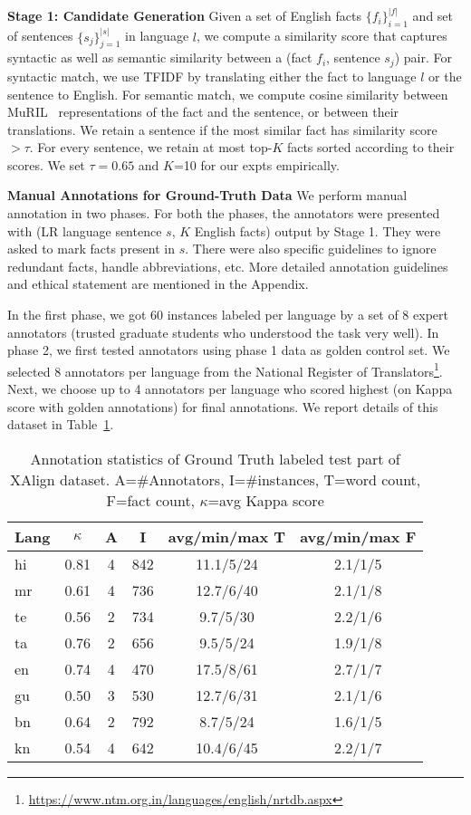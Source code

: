 \documentclass[11pt]{article}
\begin{document}
\noindent\textbf{Stage 1: Candidate Generation}
Given a set of English facts $\{f_i\}_{i=1}^{|f|}$ and set of sentences $\{s_j\}_{j=1}^{|s|}$ in language $l$, we compute a similarity score that captures syntactic as well as semantic similarity between a (fact $f_i$, sentence $s_j$) pair.
For syntactic match, we use TFIDF by translating either the fact to language $l$ or the sentence to English. For semantic match, we compute cosine similarity between MuRIL~\cite{khanuja2021muril} representations of the fact and the sentence, or between their translations. We retain a sentence if the most similar fact has similarity score $>\tau$. For every sentence, we retain at most top-$K$ facts sorted according to their scores. We set $\tau=0.65$ and $K$=10 for our expts empirically.

\noindent\textbf{Manual Annotations for Ground-Truth Data}
We perform manual annotation in two phases. For both the phases, the annotators were presented with (LR language sentence $s$, $K$ English facts) output by Stage 1. They were asked to mark facts present in $s$. There were also specific guidelines to ignore redundant facts, handle abbreviations, etc. More detailed annotation guidelines and ethical statement are mentioned in the Appendix.


In the first phase, we got 60 instances labeled per language by a set of 8 expert annotators (trusted graduate students who understood the task very well). In phase 2, we first tested annotators using phase 1 data as golden control set. We selected 8 annotators per language from the National Register of Translators\footnote{\url{https://www.ntm.org.in/languages/english/nrtdb.aspx}}. Next, we choose up to 4 annotators per language who scored highest (on Kappa score with golden annotations) for final annotations. We report details of this dataset in Table~\ref{tab:annotationStats}. 

\begin{table}[!h]
    \centering
    \scriptsize
    \begin{tabular}{|l|c|c|c|c|c|}
    \hline
    Lang & $\kappa$&A&I&avg/min/max T&avg/min/max F\\
    \hline
    \hline
    hi&0.81&4&842&11.1/5/24&2.1/1/5\\
    \hline
    mr&0.61&4&736&12.7/6/40&2.1/1/8\\
    \hline
    te&0.56&2&734&9.7/5/30&2.2/1/6\\
    \hline
    ta&0.76&2&656&9.5/5/24&1.9/1/8\\
    \hline
    en&0.74&4&470&17.5/8/61&2.7/1/7\\
    \hline
    gu&0.50&3&530&12.7/6/31&2.1/1/6\\
    \hline
    bn&0.64&2&792&8.7/5/24&1.6/1/5\\
    \hline
    kn&0.54&4&642&10.4/6/45&2.2/1/7\\
    \hline
    \end{tabular}
    \caption{Annotation statistics of Ground Truth labeled test part of XAlign dataset. A=\#Annotators, I=\#instances, T=word count, F=fact count, $\kappa$=avg Kappa score}
    \label{tab:annotationStats}
\end{table}
\end{document}
